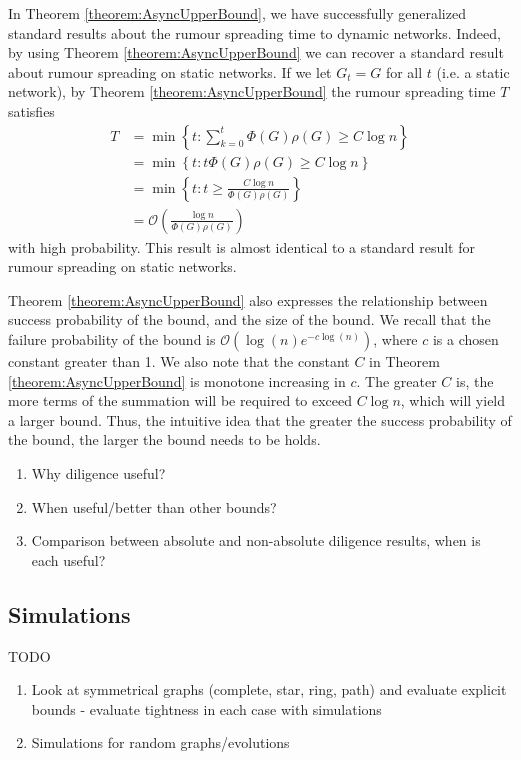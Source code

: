 In Theorem \ref{theorem:AsyncUpperBound}, we have successfully generalized standard results about the rumour spreading time to dynamic networks. Indeed, by using Theorem \ref{theorem:AsyncUpperBound} we can recover a standard result about rumour spreading on static networks. If we let $G_t = G$ for all $t$ (i.e. a static network), by Theorem \ref{theorem:AsyncUpperBound} the rumour spreading time $T$ satisfies 
\begin{align*}
	T &= \min \left\{t : \sum_{k=0}^t \Phi(G)\rho(G) \geq C \log n \right\} \\
	&= \min \left\{t : t \Phi(G)\rho(G) \geq C \log n \right\}  \\
	&= \min \left\{t : t \geq \frac{C \log n}{\Phi(G)\rho(G)}\right\}  \\
	&= \mathcal{O}\left(\frac{\log n}{\Phi(G)\rho(G)}\right)
\end{align*}
with high probability. This result is almost identical to a standard result for rumour spreading on static networks.  %


Theorem \ref{theorem:AsyncUpperBound} also expresses the relationship between success probability of the bound, and the size of the bound. We recall that the failure probability of the bound is $\mathcal{O}\left(\log(n) e^{-c \log(n)}\right)$, where $c$ is a chosen constant greater than 1. %
We also note that the constant $C$ in Theorem \ref{theorem:AsyncUpperBound} is monotone increasing in $c$. The greater $C$ is, the more terms of the summation will be required to exceed $C \log n$, which will yield a larger bound. Thus, the intuitive idea that the greater the success probability of the bound, the larger the bound needs to be holds.




 

\begin{enumerate}
	\item Why diligence useful?
	\item When useful/better than other bounds?
	\item Comparison between absolute and non-absolute  diligence results, when is each useful?
\end{enumerate}

\subsection{Simulations}

TODO 

\begin{enumerate}
	\item Look at symmetrical graphs (complete, star, ring, path) and evaluate explicit bounds - evaluate tightness in each case with simulations
	\item Simulations for random graphs/evolutions
\end{enumerate}